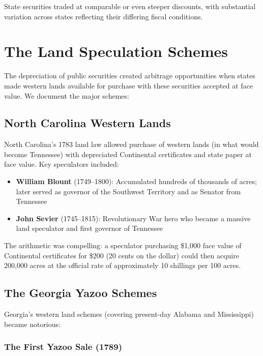 \documentclass[12pt]{article}
\begin{document}
State securities traded at comparable or even steeper discounts, with substantial variation across states reflecting their differing fiscal conditions.

\section{The Land Speculation Schemes}\label{sec:schemes}

The depreciation of public securities created arbitrage opportunities when states made western lands available for purchase with these securities accepted at face value. We document the major schemes:

\subsection{North Carolina Western Lands}

North Carolina's 1783 land law allowed purchase of western lands (in what would become Tennessee) with depreciated Continental certificates and state paper at face value. Key speculators included:

\begin{itemize}
\item \textbf{William Blount} (1749--1800): Accumulated hundreds of thousands of acres; later served as governor of the Southwest Territory and as Senator from Tennessee
\item \textbf{John Sevier} (1745--1815): Revolutionary War hero who became a massive land speculator and first governor of Tennessee
\end{itemize}

The arithmetic was compelling: a speculator purchasing \$1,000 face value of Continental certificates for \$200 (20 cents on the dollar) could then acquire 200,000 acres at the official rate of approximately 10 shillings per 100 acres.

\subsection{The Georgia Yazoo Schemes}

Georgia's western land schemes (covering present-day Alabama and Mississippi) became notorious:

\subsubsection{The First Yazoo Sale (1789)}
\end{document}
